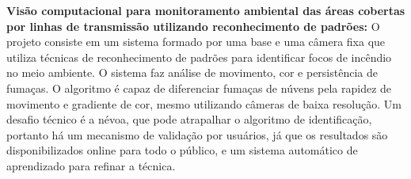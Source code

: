 \textbf{Visão computacional para monitoramento ambiental das áreas cobertas por
linhas de transmissão utilizando reconhecimento de padrões:}
O projeto consiste em um sistema formado por uma base e uma câmera fixa que
utiliza técnicas de reconhecimento de padrões para identificar focos de incêndio
no meio ambiente. O sistema faz análise de movimento, cor e
persistência de fumaças. O algoritmo é capaz de diferenciar fumaças de núvens
pela rapidez de movimento e gradiente de cor, mesmo utilizando câmeras de baixa
resolução. Um desafio técnico é a névoa, que pode atrapalhar o algoritmo de
identificação, portanto há um mecanismo de validação por usuários, já que os
resultados são disponibilizados online para todo o público, e um sistema
automático de aprendizado para refinar a técnica.
